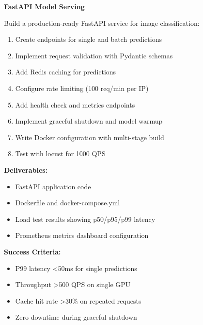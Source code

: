 \begin{exercise}
\textbf{FastAPI Model Serving}

Build a production-ready FastAPI service for image classification:

\begin{enumerate}
    \item Create endpoints for single and batch predictions
    \item Implement request validation with Pydantic schemas
    \item Add Redis caching for predictions
    \item Configure rate limiting (100 req/min per IP)
    \item Add health check and metrics endpoints
    \item Implement graceful shutdown and model warmup
    \item Write Docker configuration with multi-stage build
    \item Test with locust for 1000 QPS
\end{enumerate}

\textbf{Deliverables:}
\begin{itemize}
    \item FastAPI application code
    \item Dockerfile and docker-compose.yml
    \item Load test results showing p50/p95/p99 latency
    \item Prometheus metrics dashboard configuration
\end{itemize}

\textbf{Success Criteria:}
\begin{itemize}
    \item P99 latency <50ms for single predictions
    \item Throughput >500 QPS on single GPU
    \item Cache hit rate >30\% on repeated requests
    \item Zero downtime during graceful shutdown
\end{itemize}
\end{exercise}

